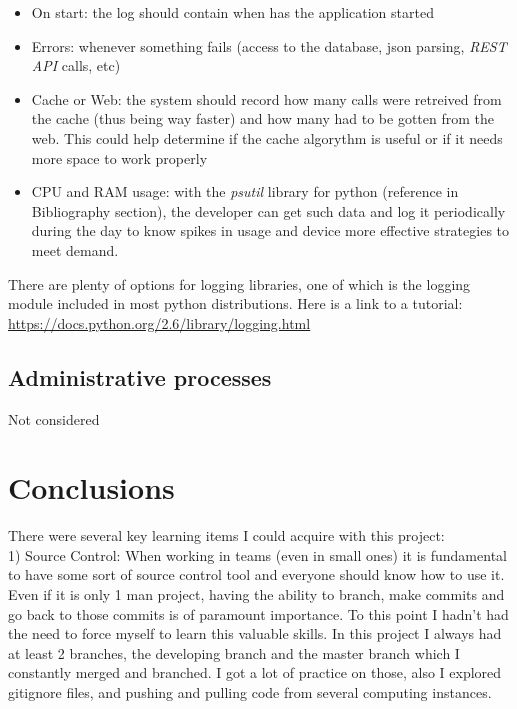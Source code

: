 \documentclass[10pt]{article}
\begin{document}
\begin{itemize}
	\item On start: the log should contain when has the application started
  	\item Errors: whenever something fails (access to the database, json parsing, \textit{REST API} calls, etc)
  	\item Cache or Web: the system should record how many calls were retreived from the cache (thus being way faster) and how many had to be gotten from the web. This could help determine if the cache algorythm is useful or if it needs more space to work properly
  	\item CPU and RAM usage: with the \textit{psutil} library for python (reference in Bibliography section), the developer can get such data and log it periodically during the day to know spikes in usage and device more effective strategies to meet demand.
\end{itemize}
 	
There are plenty of options for logging libraries, one of which is the logging module included in most python distributions. Here is a link to a tutorial:\\

\href{https://docs.python.org/2.6/library/logging.html}{https://docs.python.org/2.6/library/logging.html}\\
 
 \subsection{Administrative processes}
 
 Not considered
 
\section{Conclusions}
There were several key learning items I could acquire with this project:\\

1) Source Control: When working in teams (even in small ones) it is fundamental to have some sort of source control tool and everyone should know how to use it. Even if it is only 1 man project, having the ability to branch, make commits and go back to those commits is of paramount importance. To this point I hadn't had the need to force myself to learn this valuable skills. In this project I always had at least 2 branches, the developing branch and the master branch which I constantly merged and branched. I got a lot of practice on those, also I explored gitignore files, and pushing and pulling code from several computing instances.\\
\end{document}
